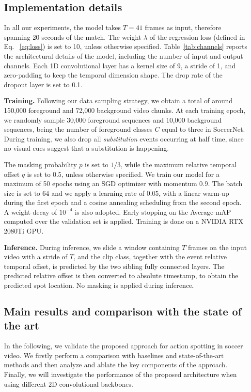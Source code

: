 \documentclass[a4paper,conference]{IEEEtran}
\newcommand{\tit}[1]{\smallbreak\noindent\textbf{#1.}}
\begin{document}
\subsection{Implementation details}
\label{sub:impl_details}
In all our experiments, the model takes $T=41$ frames as input, therefore spanning 20 seconds of the match. The weight $\lambda$ of the regression loss (defined in Eq. ~\ref{eq:loss}) is set to 10, unless otherwise specified. Table~\ref{tab:channels} reports the architectural details of the model, including the number of input and output channels. Each 1D convolutional layer has a kernel size of 9, a stride of 1, and zero-padding to keep the temporal dimension shape. The drop rate of the dropout layer is set to 0.1.

\tit{Training}
Following our data sampling strategy, we obtain a total of around 150,000 foreground and 72,000 background video chunks.
At each training epoch, we randomly sample 30,000 foreground sequences and 10,000 background sequences, being the number of foreground classes $C$ equal to three in SoccerNet. During training, we also drop all \textit{substitution} events occurring at half time, since no visual cues suggest that a substitution is happening. 

The masking probability $p$ is set to $1/3$, while the maximum relative temporal offset $q$ is set to 0.5, unless otherwise specified. 
We train our model for a maximum of 50 epochs using an SGD optimizer with momentum 0.9. The batch size is set to 64 and we apply a learning rate of 0.05, with a linear warm-up during the first epoch and a cosine annealing scheduling from the second epoch. A weight decay of $10^{-4}$ is also adopted. Early stopping on the Average-mAP computed over the validation set is applied. Training is done on a NVIDIA RTX 2080Ti GPU.



\tit{Inference}
During inference, we slide a window containing $T$ frames on the input video with a stride of $T$, and the clip class, together with the event relative temporal offset, is predicted by the two sibling fully connected layers. The predicted relative offset is then converted to absolute timestamp, to obtain the predicted spot location. No masking is applied during inference.

\subsection{Main results and comparison with the state of the art}
In the following, we validate the proposed approach for action spotting in soccer video. We firstly perform a comparison with baselines and state-of-the-art methods and then analyze and ablate the key components of the approach. Finally, we will investigate the performance of the proposed architecture when using different 2D convolutional backbones.
\end{document}
